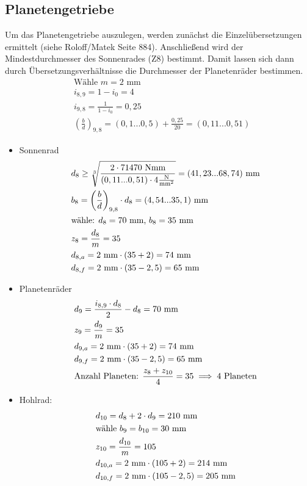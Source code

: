 \subsection{Planetengetriebe}
Um das Planetengetriebe auszulegen, werden zunächst die Einzelübersetzungen ermittelt (siehe Roloff/Matek Seite 884). Anschließend wird der Mindestdurchmesser des Sonnenrades (Z8) bestimmt. Damit lassen sich dann durch Übersetzungsverhältnisse die Durchmesser der Planetenräder bestimmen.
\begin{align*}
	&\text{Wähle } m=2  \text{ mm} \\
	&i_{8,9} = 1 - i_0 = 4 \\
	&i_{9,8} = \frac{1}{1-i_0}  = 0,25 \\
	& \left(\frac{b}{d} \right) _{9,8} = (0,1...0,5) + \frac{0,25}{20}  =  (0,11...0,51) 
\end{align*}
\begin{itemize}
\item Sonnenrad
\begin{align*}
	&d_8 \ge \sqrt[3]{\frac{2 \cdot 71470 \text{ Nmm}}{(0,11...0,51) \cdot  4 \frac{\text{N}}{\text{mm}^2}}}= (41,23...68,74) \text{ mm}\\
	&b_8= \left(\frac{b}{d} \right) _{9,8}  \cdot d_8 = (4,54...35,1) \text{ mm}  \\
	&\text{wähle: } d_8 = 70 \text{ mm, } b_8 = 35 \text{ mm}  \\
	&z_8 = \frac{d_8}{m} =35 \\
	&d_{8,a} = 2\text{ mm} \cdot (35+2) =74\text{ mm} \\
	&d_{8,f} = 2\text{ mm} \cdot (35-2,5) =65\text{ mm} 
\end{align*}
\item Planetenräder 
\begin{align*}
	&d_9 = \frac{i_{8,9} \cdot d_8}{2 } - d_8 = 70 \text{ mm}  \\
	&z_9 = \frac{d_9}{m} = 35 \\
	&d_{9,a} = 2\text{ mm} \cdot (35+2) =74\text{ mm} \\
	&d_{9,f} = 2\text{ mm} \cdot (35-2,5) =65\text{ mm} \\ 
	&\text{Anzahl Planeten: } \frac{z_{8} + z_{10}}{4} = 35 \implies 4 \text{ Planeten} 
\end{align*}	
\item Hohlrad:
\begin{align*}
	&d_{10} = d_8 + 2\cdot d_9 = 210 \text{ mm}  \\
	&\text{wähle } b_9 = b_{10} = 30 \text{ mm}  \\
	&z_{10}  = \frac{d_{10}}{m} = 105 \\
	&d_{10,a} = 2\text{ mm} \cdot (105+2) =214\text{ mm} \\
	&d_{10,f} = 2\text{ mm} \cdot (105-2,5) =205\text{ mm} 
\end{align*}	
\end{itemize}
